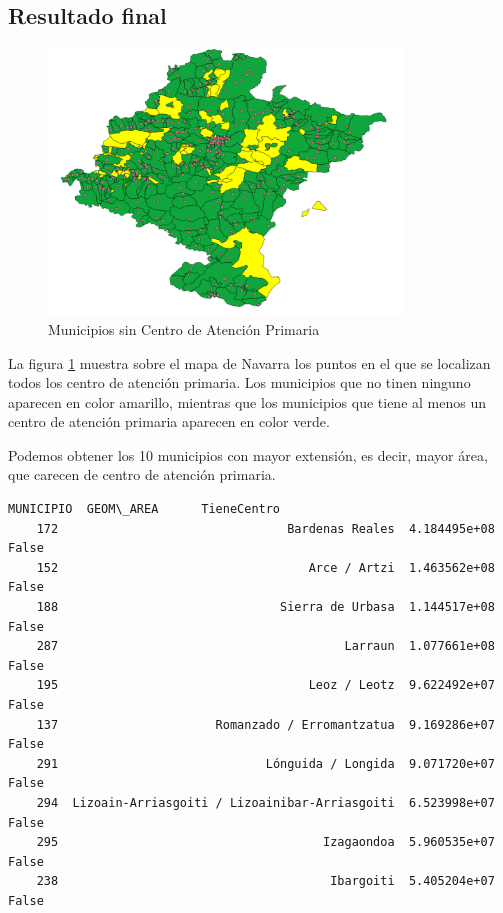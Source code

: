 \subsection{Resultado final}

\begin{figure}[H]
    \centering
    \includegraphics[width=0.84\textwidth]{Imagenes/caso-practico/municipios-sin-centro.png}
    \caption{Municipios sin Centro de Atención Primaria} \label{fig:municipios-sin-centro}
\end{figure}
La figura \ref{fig:municipios-sin-centro} muestra sobre el mapa de Navarra los puntos en el que se localizan todos los centro de atención primaria.
Los municipios que no tinen ninguno aparecen en color amarillo, mientras que los municipios que tiene al menos un centro de atención primaria aparecen en color verde.

Podemos obtener los 10 municipios con mayor extensión, es decir, mayor área, que carecen de centro de atención primaria.

\begin{tcolorbox}[breakable, size=fbox, boxrule=.5pt, pad at break*=1mm, opacityfill=0, fontupper=\tiny]
    \begin{Verbatim}[commandchars=\\\{\}]
                                             MUNICIPIO  GEOM\_AREA      TieneCentro
    172                                Bardenas Reales  4.184495e+08    False
    152                                   Arce / Artzi  1.463562e+08    False
    188                               Sierra de Urbasa  1.144517e+08    False
    287                                        Larraun  1.077661e+08    False
    195                                   Leoz / Leotz  9.622492e+07    False
    137                      Romanzado / Erromantzatua  9.169286e+07    False
    291                             Lónguida / Longida  9.071720e+07    False
    294  Lizoain-Arriasgoiti / Lizoainibar-Arriasgoiti  6.523998e+07    False
    295                                     Izagaondoa  5.960535e+07    False
    238                                      Ibargoiti  5.405204e+07    False
    \end{Verbatim}
\end{tcolorbox}

